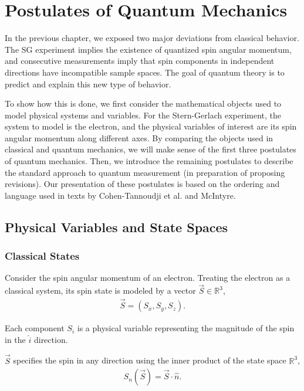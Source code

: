 \usetikzlibrary{shapes.geometric}
\usetikzlibrary{positioning}

\chapter{Postulates of Quantum Mechanics} \label{Chapter 3}

In the previous chapter, we exposed two major deviations from classical behavior. The SG experiment implies the existence of quantized spin angular momentum, and consecutive measurements imply that spin components in independent directions have incompatible sample spaces. The goal of quantum theory is to predict and explain this new type of behavior.

To show how this is done, we first consider the mathematical objects used to model physical systems and variables. For the Stern-Gerlach experiment, the system to model is the electron, and the physical variables of interest are its spin angular momentum along different axes. By comparing the objects used in classical and quantum mechanics, we will make sense of the first three postulates of quantum mechanics. Then, we introduce the remaining postulates to describe the standard approach to quantum measurement (in preparation of proposing revisions). Our presentation of these postulates is based on the ordering and language used in texts by Cohen-Tannoudji et al. \cite{cohen} and McIntyre\cite{mcintyre}.

\section{Physical Variables and State Spaces}
\subsection{Classical States} \label{classical states}
Consider the spin angular momentum of an electron. Treating the electron as a classical system, its spin state is modeled by a vector $\vec{S} \in \mathbb{R}^3$,
\begin{align}
\vec{S} = (S_x, S_y, S_z).
\end{align}

Each component $S_i$ is a physical variable representing the magnitude of the spin in the $\hat{i}$ direction.

$\vec{S}$ specifies the spin in any direction using the inner product of the state space $\mathbb{R}^3$,
\begin{align}
S_n(\vec{S}) = \vec{S} \cdot \hat{n}.
\end{align}

